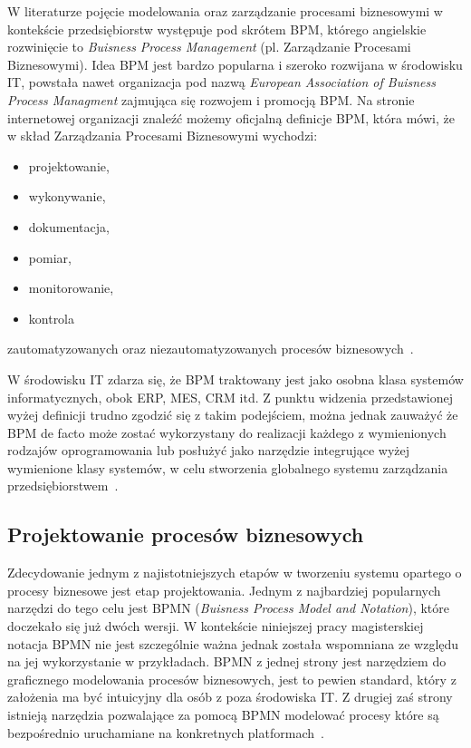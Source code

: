 W literaturze pojęcie modelowania oraz zarządzanie procesami biznesowymi w kontekście przedsiębiorstw występuje pod skrótem BPM, którego angielskie rozwinięcie to \textit{Buisness Process Management} (pl.  Zarządzanie Procesami Biznesowymi). Idea BPM jest bardzo popularna i szeroko rozwijana w środowisku IT, powstała nawet organizacja pod nazwą \textit{European Association of Buisness Process Managment} zajmująca się rozwojem i promocją BPM.  Na stronie internetowej organizacji znaleźć możemy oficjalną definicje BPM, która mówi, że w skład Zarządzania Procesami Biznesowymi wychodzi:
\begin{itemize}
\item projektowanie,
\item wykonywanie,
\item dokumentacja,
\item pomiar,
\item monitorowanie,
\item kontrola
\end{itemize}
zautomatyzowanych oraz niezautomatyzowanych procesów biznesowych~\cite{EAOBPMWeb}.

W środowisku IT zdarza się, że BPM traktowany jest jako osobna klasa systemów informatycznych, obok ERP, MES, CRM itd. Z punktu widzenia przedstawionej wyżej definicji trudno zgodzić się z takim podejściem, można jednak zauważyć że BPM de facto może zostać wykorzystany do realizacji każdego z wymienionych rodzajów oprogramowania lub posłużyć jako narzędzie integrujące wyżej wymienione klasy systemów, w celu stworzenia globalnego systemu zarządzania przedsiębiorstwem~\cite{wiBPMA}.

\subsection{Projektowanie procesów biznesowych}
\label{sec:projektowanieBPM}

Zdecydowanie jednym z najistotniejszych etapów w tworzeniu systemu opartego o procesy biznesowe jest etap projektowania. Jednym z najbardziej popularnych narzędzi do tego celu jest BPMN (\textit{Buisness Process Model and Notation}), które doczekało się już dwóch wersji. W kontekście niniejszej pracy magisterskiej notacja BPMN nie jest szczególnie ważna jednak została wspomniana ze względu na jej wykorzystanie w przykładach. BPMN z jednej strony jest narzędziem do graficznego modelowania procesów biznesowych, jest to pewien standard, który z założenia ma być intuicyjny dla osób z poza środowiska IT. Z drugiej zaś strony istnieją narzędzia pozwalające za pomocą BPMN modelować procesy które są bezpośrednio uruchamiane na konkretnych platformach~\cite{BPMN}. 

